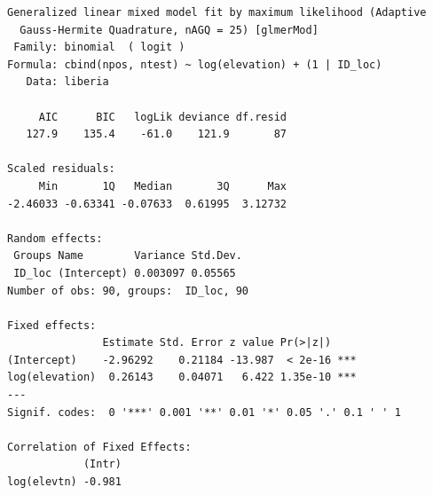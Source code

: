 \documentclass[
  letterpaper,
]{krantz}
\newenvironment{Shaded}{\begin{snugshade}}{\end{snugshade}}
\newcommand{\AttributeTok}[1]{\textcolor[rgb]{0.40,0.45,0.13}{#1}}
\newcommand{\CommentTok}[1]{\textcolor[rgb]{0.37,0.37,0.37}{#1}}
\newcommand{\DecValTok}[1]{\textcolor[rgb]{0.68,0.00,0.00}{#1}}
\newcommand{\FunctionTok}[1]{\textcolor[rgb]{0.28,0.35,0.67}{#1}}
\newcommand{\NormalTok}[1]{\textcolor[rgb]{0.00,0.23,0.31}{#1}}
\newcommand{\OtherTok}[1]{\textcolor[rgb]{0.00,0.23,0.31}{#1}}
\newcommand{\SpecialCharTok}[1]{\textcolor[rgb]{0.37,0.37,0.37}{#1}}
\newcommand{\StringTok}[1]{\textcolor[rgb]{0.13,0.47,0.30}{#1}}
\begin{document}
\begin{Shaded}
\end{Shaded}

\begin{verbatim}
Generalized linear mixed model fit by maximum likelihood (Adaptive
  Gauss-Hermite Quadrature, nAGQ = 25) [glmerMod]
 Family: binomial  ( logit )
Formula: cbind(npos, ntest) ~ log(elevation) + (1 | ID_loc)
   Data: liberia

     AIC      BIC   logLik deviance df.resid 
   127.9    135.4    -61.0    121.9       87 

Scaled residuals: 
     Min       1Q   Median       3Q      Max 
-2.46033 -0.63341 -0.07633  0.61995  3.12732 

Random effects:
 Groups Name        Variance Std.Dev.
 ID_loc (Intercept) 0.003097 0.05565 
Number of obs: 90, groups:  ID_loc, 90

Fixed effects:
               Estimate Std. Error z value Pr(>|z|)    
(Intercept)    -2.96292    0.21184 -13.987  < 2e-16 ***
log(elevation)  0.26143    0.04071   6.422 1.35e-10 ***
---
Signif. codes:  0 '***' 0.001 '**' 0.01 '*' 0.05 '.' 0.1 ' ' 1

Correlation of Fixed Effects:
            (Intr)
log(elevtn) -0.981
\end{verbatim}
\end{document}
